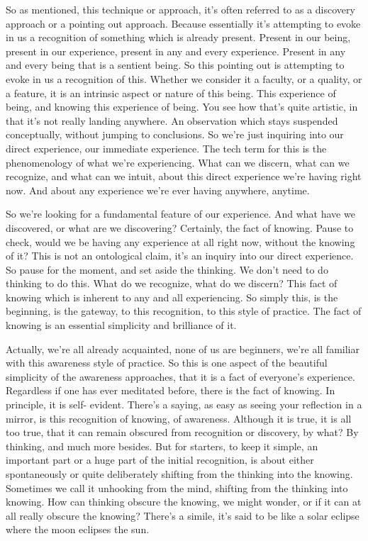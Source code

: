 \documentclass[12pt,openany]{book}
\begin{document}
So as mentioned, this technique or approach, it's often referred to as a discovery approach or a pointing out approach. Because essentially it's attempting to evoke in us a recognition of something which is already present. Present in our being, present in our experience, present in any and every experience. Present in any and every being that is a sentient being. So this pointing out is attempting to evoke in us a recognition of this. Whether we consider it a faculty, or a quality, or a feature, it is an intrinsic aspect or nature of this being. This experience of being, and knowing this experience of being. You see how that's quite artistic, in that it’s not really landing anywhere. An observation which stays suspended conceptually, without jumping to conclusions. So we're just inquiring into our direct experience, our immediate experience. The tech term for this is the phenomenology of what we’re experiencing. What can we discern, what can we recognize, and what can we intuit, about this direct experience we're having right now. And about any experience we’re ever having anywhere, anytime.

So we're looking for a fundamental feature of our experience. And what have we discovered, or what are we discovering? Certainly, the fact of knowing. Pause to check, would we be having any experience at all right now, without the knowing of it? This is not an ontological claim, it's an inquiry into our direct experience. So pause for the moment, and set aside the thinking. We don’t need to do thinking to do this. What do we recognize, what do we discern? This fact of knowing which is inherent to any and all experiencing. So simply this, is the beginning, is the gateway, to this recognition, to this style of practice. The fact of knowing is an essential simplicity and brilliance of it.

Actually,  we're all already acquainted, none of us are beginners, we're all familiar with this awareness style of practice. So this is one aspect of the beautiful simplicity of the awareness approaches, that it is a fact of everyone's experience. Regardless if one has ever meditated before, there is the fact of knowing. In principle, it is self- \linebreak evident. There's a saying, as easy as seeing your reflection in a mirror, is this recognition of knowing, of awareness. Although it is true, it is all too true, that it can remain obscured from recognition or discovery, by what? By thinking, and much more besides. But for starters, to keep it simple, an important part or a huge part of the initial recognition, is about either spontaneously or quite deliberately shifting from the thinking into the knowing. Sometimes we call it unhooking from the mind, shifting from the thinking into knowing. How can thinking obscure the knowing, we might wonder, or if it can at all really obscure the knowing? There's a simile, it's said to be like a solar eclipse where the moon eclipses the sun.
\end{document}

